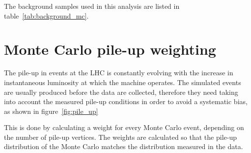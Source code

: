 The background samples used in this analysis are listed in
table~\ref{tab:background_mc}.



\section{Monte Carlo pile-up weighting}
The pile-up in events at the LHC is constantly evolving with the increase in
instantaneous luminosity at which the machine operates. The simulated events
are usually produced before the data are collected, therefore they need
taking into account the measured pile-up conditions in order to
avoid a systematic bias, as shown in figure~\ref{fig:pile_up}

This is done by calculating a weight for every Monte Carlo event, depending
on the number of pile-up vertices.
The weights are calculated so that the pile-up distribution of the Monte
Carlo matches the distribution measured in the data.
